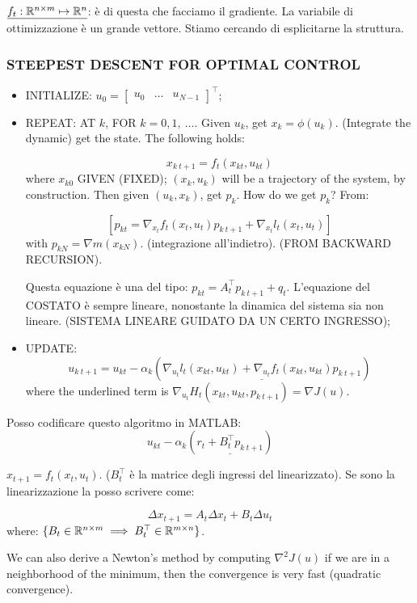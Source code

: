 $\underline{f_t:\mathbb{R}^{n\times m}\mapsto\mathbb{R}^n}$: è di questa che facciamo il gradiente. La variabile di ottimizzazione è un grande vettore. Stiamo cercando di esplicitarne la struttura.

\subsubsection{STEEPEST DESCENT FOR OPTIMAL CONTROL}

\begin{itemize}
\item{INITIALIZE}: $u_0 = \begin{bmatrix}u_0&\dots&u_{N-1}\end{bmatrix}^\top$;
\item{REPEAT}: AT $k$, FOR $k=0,1,\ \dots$. 
Given $u_k$, get $x_k=\phi(u_k)$. (Integrate the dynamic) get the state. The following holds:

\[
	x_{k\ t+1} = f_t(x_{kt},u_{kt})
\]
where $x_{k0}$ GIVEN (FIXED); $(x_k,u_k)$ will be a trajectory of the system, by construction.
Then given $(u_k,x_k)$, get $p_k$. How do we get $p_k$? From:

\[
	[p_{kt} = \nabla_{x_t}{f_t(x_t,u_t)}p_{k\ t+1} + \nabla_{x_t}{l_t(x_t,u_t)}]
\]
with $p_{kN} = \nabla{m(x_{kN})}$. (integrazione all'indietro). (FROM BACKWARD RECURSION).

Questa equazione è una del tipo: $p_{kt} = A_t^\top p_{k\ t+1} + q_t$. L'equazione del COSTATO è sempre lineare, nonostante la dinamica del sistema sia non lineare. (SISTEMA LINEARE GUIDATO DA UN CERTO INGRESSO);

\item{UPDATE}:
\[
	u_{k\ t+1} = u_{kt} -\alpha_k(\underline{\nabla_{u_t}{l_t(x_{kt},u_{kt})} + \nabla_{u_t}{f_t(x_{kt},u_{kt})}p_{k\ t+1}})
\]
where the underlined term is $\nabla_{u_t}{H_t(x_{kt},u_{kt},p_{k\ t+1})} = \nabla{J(u)}$.
\end{itemize}

Posso codificare questo algoritmo in MATLAB:
\[
	u_{kt} - \alpha_k(\underline{r_t + B_t^\top p_{k\ t+1}})
\]

$x_{t+1}=f_t(x_t,u_t)$. ($B_t^\top$ è la matrice degli ingressi del linearizzato). Se sono la linearizzazione la posso scrivere come:

\[
	\Delta x_{t+1} = A_t\Delta x_t + B_t\Delta u_t
\]
where: $\{B_t\in\mathbb{R}^{n\times m}\implies B_t^\top\in\mathbb{R}^{m\times n}\}$.

We can also derive a Newton's method by computing $\nabla^2{J(u)}$ if we are in a neighborhood of the minimum, then the convergence is very fast (quadratic convergence).

